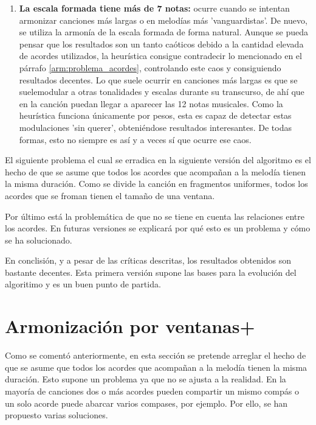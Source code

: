 \begin{enumerate}
    \item[\textbullet] \textbf{La escala formada tiene más de 7 notas:} ocurre cuando se intentan armonizar canciones más largas o en melodías más 'vanguardistas'. De nuevo, se utiliza la armonía de la escala formada de forma natural. Aunque se pueda pensar que los resultados son un tanto caóticos debido a la cantidad elevada de acordes utilizados, la heurística consigue contradecir lo mencionado en el párrafo \ref{arm:problema_acordes}, controlando este caos y consiguiendo resultados decentes. Lo que suele ocurrir en canciones más largas es que se suelemodular a otras tonalidades y escalas durante su transcurso, de ahí que en la canción puedan llegar a aparecer las 12 notas musicales. Como la heurística funciona únicamente por pesos, esta es capaz de detectar estas modulaciones 'sin querer', obteniéndose resultados interesantes. De todas formas, esto no siempre es así y a veces sí que ocurre ese caos.

\end{enumerate}

    El siguiente problema el cual se erradica en la siguiente versión del algoritmo es el hecho de que se asume que todos los acordes que acompañan a la melodía tienen la misma duración. Como se divide la canción en fragmentos uniformes, todos los acordes que se froman tienen el tamaño de una ventana.

    Por último está la problemática de que no se tiene en cuenta las relaciones entre los acordes. En futuras versiones se explicará por qué esto es un problema y cómo se ha solucionado.

    En conclisión, y a pesar de las críticas descritas, los resultados obtenidos son bastante decentes. Esta primera versión  supone las bases para la evolución del algoritimo y es un buen punto de partida.

\section{Armonización por ventanas+}\label{arm:subsec:ventanas_plus}

Como se comentó anteriormente, en esta sección se pretende arreglar el hecho de que se asume que todos los acordes que acompañan a la melodía tienen la misma duración. Esto supone un problema ya que no se ajusta a la realidad. En la mayoría de canciones dos o más acordes pueden compartir un mismo compás o un solo acorde puede abarcar varios compases, por ejemplo. Por ello, se han propuesto varias soluciones.

